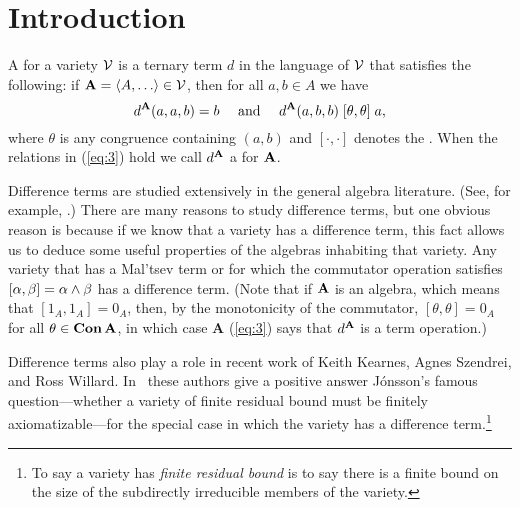 \section{Introduction}
\label{sec:introduction}

A  for a variety $\mathcal{V}$ is a ternary term $d$ in the
language of $\mathcal{V}$ that satisfies the following:
if $\alg{A} = \<A, \dots \> \in \sV$, then for all $a, b \in A$ we have
\begin{equation}
\label{eq:3}
d^{\mathbf{A}}(a,a,b) = b \quad \text{ and } \quad
d^{\mathbf{A}}(a,b,b) \mathrel{[\theta, \theta]} a,
\end{equation}
where $\theta$ is any congruence %
containing $(a,b)$
and $[\cdot, \cdot]$ denotes the .
When the relations in (\ref{eq:3}) hold we call $d^{\mathbf{A}}$
a  for $\mathbf{A}$.

Difference terms are studied extensively in the general algebra literature.
(See, for example, \cite{MR1358491,MR1663558,MR3076179,KSW,MR3449235}.)
There are many reasons to study difference terms, but
one obvious reason is because if we know that a variety
has a difference term, this fact allows us to deduce some useful
properties of the algebras inhabiting that variety.
Any variety that has a Mal'tsev term or for which the commutator operation satisfies $[\alpha, \beta] = \alpha \meet \beta$ has a difference term.
(Note that if
$\mathbf{A}$ is an  algebra, which means
that $[1_A, 1_A] = 0_A$, then, by
the monotonicity of the commutator,
$[\theta, \theta] = 0_A$ for all $\theta \in \operatorname{\mathbf{Con}} \mathbf{A}$,
in which case $\textbf{A}$
(\ref{eq:3}) says that $d^{\mathbf{A}}$ is a \malcev term operation.)

Difference terms also play a role in recent work of Keith Kearnes,
Agnes Szendrei, and Ross Willard.
In~\cite{MR3449235} these authors give a positive answer
J\'onsson's famous question---whether a variety of finite
residual bound must be finitely
axiomatizable---for the
special case in which the variety has a difference
term.\footnote{To say a variety has \emph{finite residual bound} is to say
  there is a finite bound on the size of the subdirectly irreducible
  members of the variety.}

